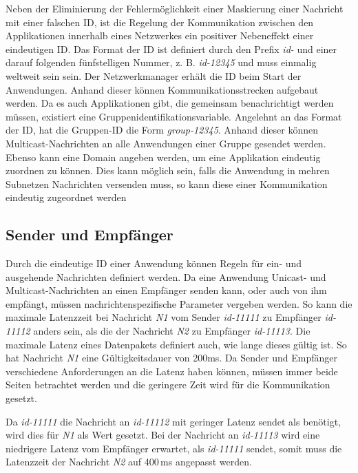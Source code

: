 \newpage

Neben der Eliminierung der Fehlermöglichkeit einer Maskierung einer Nachricht mit einer falschen \ac{ID}, ist die Regelung der Kommunikation zwischen den Applikationen innerhalb eines Netzwerkes ein positiver Nebeneffekt einer eindeutigen \ac{ID}. Das Format der \ac{ID} ist definiert durch den Prefix \emph{id-} und einer darauf folgenden fünfstelligen Nummer, z. B. \emph{id-12345} und muss einmalig weltweit sein sein. Der Netzwerkmanager erhält die \ac{ID} beim Start der Anwendungen. Anhand dieser können Kommunikationsstrecken aufgebaut werden.\newline
Da es auch Applikationen gibt, die gemeinsam benachrichtigt werden müssen, existiert eine Gruppenidentifikationsvariable. Angelehnt an das Format der \ac{ID}, hat die Gruppen-ID die Form \emph{group-12345}. Anhand dieser können Multicast-Nachrichten an alle Anwendungen einer Gruppe gesendet werden. 
Ebenso kann eine Domain angeben werden, um eine Applikation eindeutig zuordnen zu können. Dies kann möglich sein, falls die Anwendung in mehren Subnetzen Nachrichten versenden muss, so kann diese einer Kommunikation eindeutig zugeordnet werden

\subsection{Sender und Empfänger}
Durch die eindeutige \ac{ID} einer Anwendung können Regeln für ein- und ausgehende Nachrichten definiert werden. Da eine Anwendung Unicast- und Multicast-Nachrichten an einen Empfänger senden kann, oder auch von ihm empfängt, müssen nachrichtenspezifische Parameter vergeben werden. So kann die maximale Latenzzeit bei Nachricht \emph{N1} vom Sender \emph{id-11111} zu Empfänger \emph{id-11112} anders sein, als die der Nachricht \emph{N2} zu Empfänger \emph{id-11113}. Die maximale Latenz eines Datenpakets definiert auch, wie lange dieses gültig ist. So hat Nachricht \emph{N1} eine Gültigkeitsdauer von 200ms. Da Sender und Empfänger verschiedene Anforderungen an die Latenz haben können, müssen immer beide Seiten betrachtet werden und die geringere Zeit wird für die Kommunikation gesetzt. 


\newpage

Da \emph{id-11111} die Nachricht an \emph{id-11112} mit geringer Latenz sendet als benötigt, wird dies für \emph{N1} als Wert gesetzt. Bei der Nachricht an \emph{id-11113} wird eine niedrigere Latenz vom Empfänger erwartet, als \emph{id-11111} sendet, somit muss die Latenzzeit der Nachricht \emph{N2} auf 400\,ms angepasst werden.

